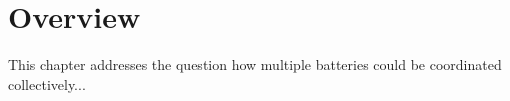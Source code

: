 \section{Overview}
\label{ch4:sec:overview}

This chapter addresses the question how multiple batteries could be coordinated collectively...